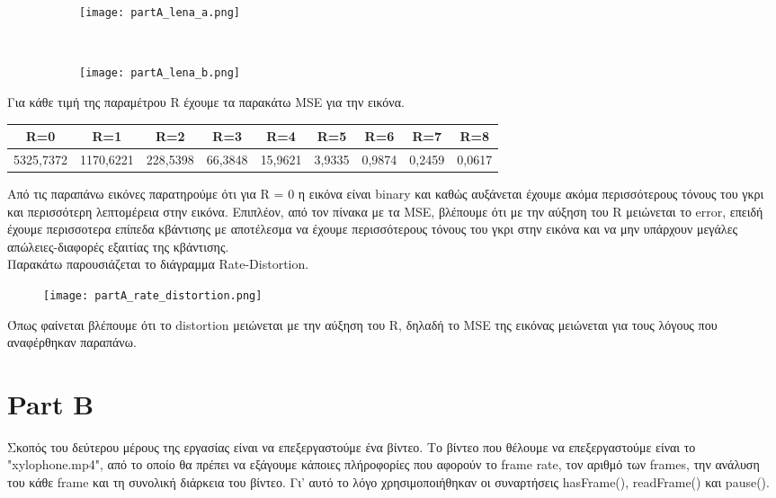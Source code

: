 \documentclass{article}
\begin{document}
	\begin{figure}[h!]
	 	\centering
	 	\begin{subfigure}[t]{0.5\textwidth}
	 		\centering
	 		\texttt{[image: partA\_lena\_a.png]}
	 	\end{subfigure}%
	 	~
	 	\begin{subfigure}[t]{0.5\textwidth}
	 		\centering
	 		\texttt{[image: partA\_lena\_b.png]}
	 	\end{subfigure}
	\end{figure}

	\noindent
	Για κάθε τιμή της παραμέτρου R έχουμε τα παρακάτω MSE για την εικόνα.\\
	\begin{table}[h!]
		\centering
		\begin{tabular}{|c|c|c|c|c|c|c|c|c|}
			\hline
			R=0 & R=1 & R=2 & R=3 & R=4 & R=5 & R=6 & R=7 & R=8 \\
			\hline
			5325,7372 & 1170,6221 & 228,5398 & 66,3848 & 15,9621 & 3,9335 & 0,9874 & 0,2459 & 0,0617 \\
			\hline
		\end{tabular}
	\end{table}

	\pagebreak
	\noindent
	Από τις παραπάνω εικόνες παρατηρούμε ότι για R = 0 η εικόνα είναι binary και καθώς αυξάνεται έχουμε ακόμα περισσότερους τόνους του γκρι και περισσότερη λεπτομέρεια στην εικόνα. Επιπλέον, από τον πίνακα με τα MSE, βλέπουμε ότι με την αύξηση του R μειώνεται το error, επειδή έχουμε περισσοτερα επίπεδα κβάντισης με αποτέλεσμα να έχουμε περισσότερους τόνους του γκρι στην εικόνα και να μην υπάρχουν μεγάλες απώλειες-διαφορές εξαιτίας της κβάντισης. \\
	
	\noindent
	Παρακάτω παρουσιάζεται το διάγραμμα Rate-Distortion. \\
	\begin{figure}[h!]
		\centering
		\texttt{[image: partA\_rate\_distortion.png]}
	\end{figure}

	\noindent
	Όπως φαίνεται βλέπουμε ότι το distortion μειώνεται με την αύξηση του R, δηλαδή το MSE της εικόνας μειώνεται για τους λόγους που αναφέρθηκαν παραπάνω.
	
\section*{Part B}
	Σκοπός του δεύτερου μέρους της εργασίας είναι να επεξεργαστούμε ένα βίντεο. Το βίντεο που θέλουμε να επεξεργαστούμε είναι το "xylophone.mp4", από το οποίο θα πρέπει να εξάγουμε κάποιες πλήροφορίες που αφορούν το frame rate, τον αριθμό των frames, την ανάλυση του κάθε frame και τη συνολική διάρκεια του βίντεο. Γι' αυτό το λόγο χρησιμοποιήθηκαν οι συναρτήσεις hasFrame(), readFrame() και pause().  
	
\end{document}
